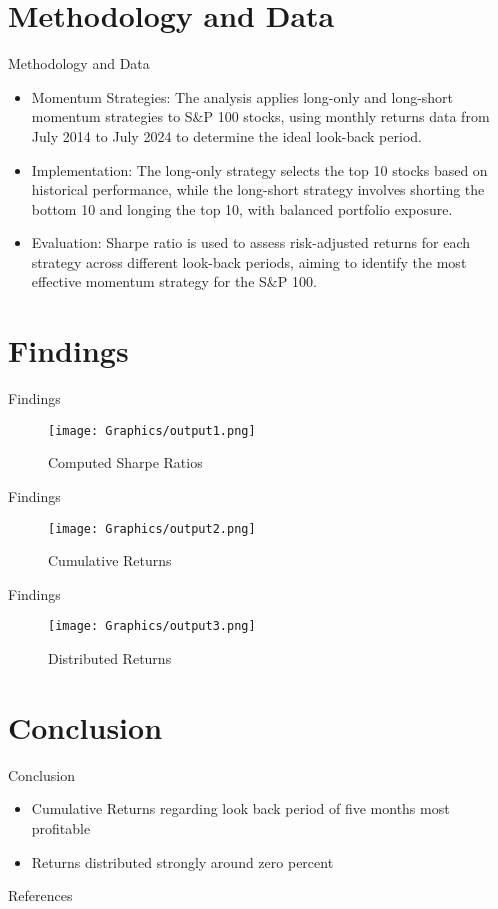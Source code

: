 \documentclass{beamer}
\begin{document}
\section{Methodology and Data}
\begin{frame}{Methodology and Data}
\begin{itemize}
        \item Momentum Strategies: The analysis applies long-only and long-short momentum strategies to S\&P 100 stocks, using monthly returns data from July 2014 to July 2024 to determine the ideal look-back period.
        \item Implementation: The long-only strategy selects the top 10 stocks based on historical performance, while the long-short strategy involves shorting the bottom 10 and longing the top 10, with balanced portfolio exposure.
        \item Evaluation: Sharpe ratio is used to assess risk-adjusted returns for each strategy across different look-back periods, aiming to identify the most effective momentum strategy for the S\&P 100.
    \end{itemize}
\end{frame}

\section{Findings}
\begin{frame}{Findings}
\begin{figure}
    \centering
    \texttt{[image: Graphics/output1.png]}
    \caption{Computed Sharpe Ratios}
    \label{fig:enter-label}
\end{figure}
\end{frame}

\begin{frame}{Findings}
\begin{figure}
    \centering
    \texttt{[image: Graphics/output2.png]}
    \caption{Cumulative Returns}
    \label{fig:enter-label}
\end{figure}
\end{frame}

\begin{frame}{Findings}
\begin{figure}
    \centering
    \texttt{[image: Graphics/output3.png]}
    \caption{Distributed Returns}
    \label{fig:enter-label}
\end{figure}
\end{frame}

\section{Conclusion}
\begin{frame}{Conclusion}
\begin{itemize}
    \item Cumulative Returns regarding look back period of five months most profitable
    \item Returns distributed strongly around zero percent
\end{itemize}
\end{frame}


\begin{frame}{References}
    \printbibliography
\end{frame}
\end{document}
